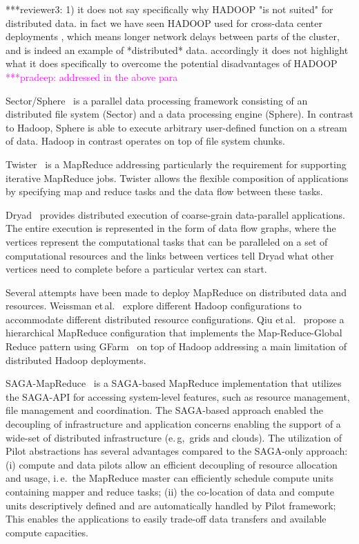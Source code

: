 \documentclass{acm_proc_article-sp}
\newcommand{\pnote}[1]{ {\textcolor{magenta} { ***pradeep: #1 }}}
\newcommand{\thirdrev}[1]{ {\textcolor{Bittersweet} { ***reviewer3: #1 }}}
\newcommand{\pnote}[1]{}
\begin{document}
\thirdrev{1) it does not say specifically why HADOOP "is not suited" for distributed data. in fact we have seen HADOOP used for cross-data center deployments , which means longer network delays between parts of the cluster, and is indeed an example of *distributed* data. accordingly it does not highlight what it does specifically to overcome the potential disadvantages of HADOOP}
\pnote{addressed in the above para} 

Sector/Sphere~\cite{Gu_Grossman_2009} is a parallel data processing framework
consisting of an distributed file system (Sector) and a data processing engine
(Sphere). In contrast to Hadoop, Sphere is able to execute arbitrary 
user-defined function on a stream of data. Hadoop in contrast operates on top 
of file system chunks.

Twister~\cite{Ekanayake:2010:TRI:1851476.1851593} is a 
MapReduce addressing particularly the requirement for supporting iterative 
MapReduce jobs. Twister allows the flexible composition of applications by 
specifying map and reduce tasks and the data flow between these tasks. 

Dryad~\cite{Isard:2007:DDD:1272998.1273005} provides distributed execution of
coarse-grain data-parallel applications. The entire execution is represented in
the form of data flow graphs, where the vertices represent the computational
tasks that can be paralleled on a set of computational resources and the links
between vertices tell Dryad what other vertices need to complete before a
particular vertex can start.

Several attempts have been made to deploy MapReduce on distributed data and
resources. Weissman et\,al.~\cite{weissman-mr-11} explore different Hadoop
configurations to accommodate different distributed resource configurations. 
Qiu et\,al.~\cite{ecmls11-mr-autodock} propose a hierarchical
MapReduce configuration that implements the Map-Reduce-Global Reduce pattern 
using GFarm~\cite{Mikami:2011:UGF:2082076.2082106} on top of Hadoop addressing a 
main limitation of distributed Hadoop deployments. 

SAGA-MapReduce~\cite{Sehgal:2011:UAI:1945091.1945329} is a SAGA-based
MapReduce implementation that utilizes the SAGA-API for accessing system-level
features, such as resource management, file management and coordination. The
SAGA-based approach enabled the decoupling of infrastructure and application
concerns enabling the support of a wide-set of distributed infrastructure
(e.\,g,\ grids and clouds). The utilization of Pilot abstractions has several
advantages compared to the SAGA-only approach: (i) compute and data pilots
allow an efficient decoupling of resource allocation and usage, i.\,e.\ the
MapReduce master can efficiently schedule compute units containing mapper and
reduce tasks; (ii) the co-location of data and compute units descriptively
defined and are automatically handled by Pilot framework; This enables the
applications to easily trade-off data transfers and available compute
capacities.
\end{document}
